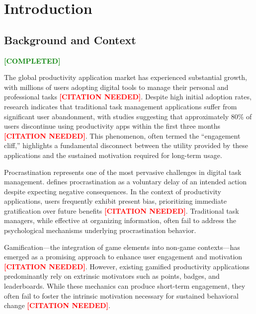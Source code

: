 \documentclass[12pt,a4paper]{report}
\newcommand{\completed}{\textcolor{green}{\textbf{[COMPLETED]}}}
\newcommand{\citationneeded}{\textcolor{red}{\textbf{[CITATION NEEDED]}}}
\begin{document}
\tableofcontents
\listoffigures
\listoftables

\chapter{Introduction}
\label{chap:introduction}

\section{Background and Context}
\label{sec:background}

\completed

The global productivity application market has experienced substantial growth, with millions of users adopting digital tools to manage their personal and professional tasks \citationneeded. Despite high initial adoption rates, research indicates that traditional task management applications suffer from significant user abandonment, with studies suggesting that approximately 80\% of users discontinue using productivity apps within the first three months \citationneeded. This phenomenon, often termed the ``engagement cliff,'' highlights a fundamental disconnect between the utility provided by these applications and the sustained motivation required for long-term usage.

Procrastination represents one of the most pervasive challenges in digital task management. \citet{steel2007nature} defines procrastination as a voluntary delay of an intended action despite expecting negative consequences. In the context of productivity applications, users frequently exhibit present bias, prioritizing immediate gratification over future benefits \citationneeded. Traditional task managers, while effective at organizing information, often fail to address the psychological mechanisms underlying procrastination behavior.

Gamification---the integration of game elements into non-game contexts---has emerged as a promising approach to enhance user engagement and motivation \citationneeded. However, existing gamified productivity applications predominantly rely on extrinsic motivators such as points, badges, and leaderboards. While these mechanics can produce short-term engagement, they often fail to foster the intrinsic motivation necessary for sustained behavioral change \citationneeded.
\end{document}

